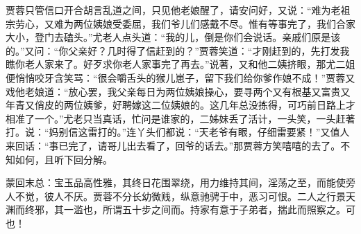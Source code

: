 \begin{parag}
    贾蓉只管信口开合胡言乱道之间，只见他老娘醒了，请安问好，又说：“难为老祖宗劳心，又难为两位姨娘受委屈，我们爷儿们感戴不尽。惟有等事完了，我们合家大小，登门去磕头。”尤老人点头道：“我的儿，倒是你们会说话。亲戚们原是该的。”又问：“你父亲好？几时得了信赶到的？”贾蓉笑道：“才刚赶到的，先打发我瞧你老人家来了。好歹求你老人家事完了再去。”说著，又和他二姨挤眼，那尤二姐便悄悄咬牙含笑骂：“很会嚼舌头的猴儿崽子，留下我们给你爹作娘不成！”贾蓉又戏他老娘道：“放心罢，我父亲每日为两位姨娘操心，要寻两个又有根基又富贵又年青又俏皮的两位姨爹，好聘嫁这二位姨娘的。这几年总没拣得，可巧前日路上才相准了一个。”尤老只当真话，忙问是谁家的，二姊妹丢了活计，一头笑，一头赶著打。说：“妈别信这雷打的。”连丫头们都说：“天老爷有眼，仔细雷要紧！”又值人来回话：“事已完了，请哥儿出去看了，回爷的话去。”那贾蓉方笑嘻嘻的去了。不知如何，且听下回分解。
\end{parag}


\begin{parag}
    \begin{note}蒙回末总：宝玉品高性雅，其终日花围翠绕，用力维持其间，淫荡之至，而能使旁人不觉，彼人不厌。贾蓉不分长幼微贱，纵意驰骋于中，恶习可恨。二人之行景天渊而终邪，其一滥也，所谓五十步之间而。持家有意于子弟者，揣此而照察之。可也！\end{note}
\end{parag}

